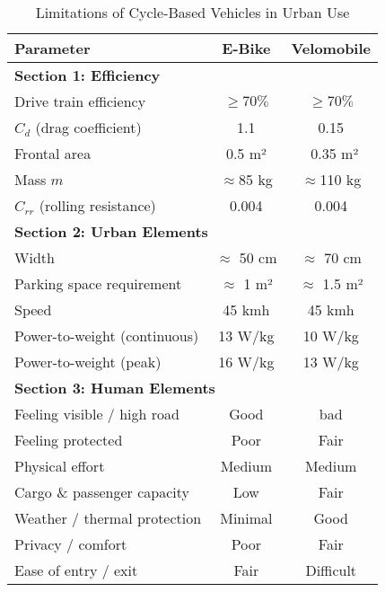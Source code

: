 \begin{table}[h!]
\centering
\caption{Limitations of Cycle-Based Vehicles in Urban Use}
\begin{tabular}{lcc}
\toprule
\textbf{Parameter} & \textbf{E-Bike} & \textbf{Velomobile} \\
\midrule
\multicolumn{3}{l}{\textbf{Section 1: Efficiency}} \\
Drive train efficiency    & \cellcolor{LightGreen}$\geq70\%$ & \cellcolor{LightGreen}$\geq70\%$ \\
$C_d$ (drag coefficient)     & \cellcolor{LightRed}1.1        & \cellcolor{LightGreen}0.15 \\
Frontal area                 & \cellcolor{LightGreen}0.5 m²   & \cellcolor{LightGreen}~0.35 m² \\
Mass $m$         & \cellcolor{LightGreen} $\approx$85 kg & \cellcolor{LightGreen} $\approx$110 kg \\
$C_{rr}$ (rolling resistance)& \cellcolor{LightGreen}0.004    & \cellcolor{LightGreen}0.004  \\
\midrule
\multicolumn{3}{l}{\textbf{Section 2: Urban Elements}} \\
Width            & \cellcolor{LightGreen} $\approx$ 50 cm & \cellcolor{LightGreen}$\approx$ 70 cm \\
Parking space requirement    & \cellcolor{LightGreen}$\approx$ 1 m²& \cellcolor{LightGreen}$\approx$ 1.5 m²\\
Speed                        & \cellcolor{LightOrange}45 kmh     & \cellcolor{LightOrange}45 kmh \\
Power-to-weight (continuous) & \cellcolor{LightOrange}13 W/kg        & \cellcolor{LightOrange}10 W/kg\\
Power-to-weight (peak)       & \cellcolor{LightOrange}16 W/kg  & \cellcolor{LightOrange}13 W/kg\\
\midrule
\multicolumn{3}{l}{\textbf{Section 3: Human Elements}} \\
Feeling visible / high road  & \cellcolor{LightGreen}Good     & \cellcolor{LightRed}bad \\
Feeling protected            & \cellcolor{LightRed}Poor       & \cellcolor{LightOrange}Fair \\
Physical effort              & \cellcolor{LightOrange}Medium  & \cellcolor{LightOrange}Medium \\
Cargo \& passenger capacity  & \cellcolor{LightRed}Low        & \cellcolor{LightOrange}Fair \\
Weather / thermal protection & \cellcolor{LightRed}Minimal    & \cellcolor{LightGreen}Good \\
Privacy / comfort            & \cellcolor{LightRed}Poor       & \cellcolor{LightOrange}Fair \\
Ease of entry / exit         & \cellcolor{LightOrange}Fair     & \cellcolor{LightRed}Difficult \\
\bottomrule
\end{tabular}
\end{table}

